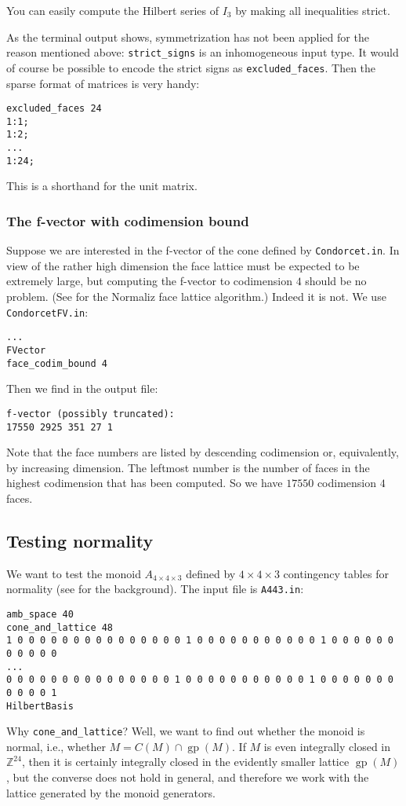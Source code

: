 \documentclass[12pt,a4paper]{scrartcl}
\theoremstyle{definition}
\def\ZZ{{\mathbb Z}}
\DeclareMathOperator{\gp}{gp}
\def\ttt{\texttt}
\begin{document}
You can easily compute the Hilbert series of $I_3$ by making all inequalities strict.

As the terminal output shows, symmetrization has not been applied for the reason mentioned above: \verb|strict_signs| is an inhomogeneous input type. It would of course be possible to encode the strict signs as \verb|excluded_faces|. Then the sparse format of matrices is very handy:
\begin{Verbatim}
excluded_faces 24
1:1;
1:2;
...
1:24;
\end{Verbatim}
This is a shorthand for the unit matrix.

\subsubsection{The f-vector with codimension bound}\label{codim_bound}

Suppose we are interested in the f-vector of the cone defined by \ttt{Condorcet.in}. In view of the rather high dimension the face lattice must be expected to be extremely large, but computing the f-vector  to codimension $4$ should be no problem. (See \cite{BGOW} for the Normaliz face lattice algorithm.)  Indeed it is not. We use \ttt{CondorcetFV.in}:
\begin{Verbatim}
...
FVector
face_codim_bound 4
\end{Verbatim}

Then we find in the output file:
\begin{Verbatim}
f-vector (possibly truncated):
17550 2925 351 27 1
\end{Verbatim}
Note that the face numbers are listed by descending codimension or, equivalently, by increasing dimension. The leftmost number is the number of faces in the highest codimension that has been computed. So we have $17550$ codimension $4$ faces.


\subsection{Testing normality}\label{normalization_ex}

We want to test the monoid $A_{4\times 4\times 3}$ defined by $4\times4\times3$ contingency tables for normality (see \cite{BHIKS} for the background). The input file is \ttt{A443.in}:
\begin{Verbatim}
amb_space 40
cone_and_lattice 48
1 0 0 0 0 0 0 0 0 0 0 0 0 0 0 0 1 0 0 0 0 0 0 0 0 0 0 0 1 0 0 0 0 0 0 0 0 0 0 0
...
0 0 0 0 0 0 0 0 0 0 0 0 0 0 0 1 0 0 0 0 0 0 0 0 0 0 0 1 0 0 0 0 0 0 0 0 0 0 0 1
HilbertBasis
\end{Verbatim}
Why \verb|cone_and_lattice|? Well, we want to find out whether the monoid is normal, i.e., whether $M=C(M)\cap\gp(M)$. If $M$ is even integrally closed in $\ZZ^{24}$, then it is certainly integrally closed  in the evidently smaller lattice $\gp(M)$, but the converse does not hold in general, and therefore we work with the lattice generated by the monoid generators.
\end{document}
